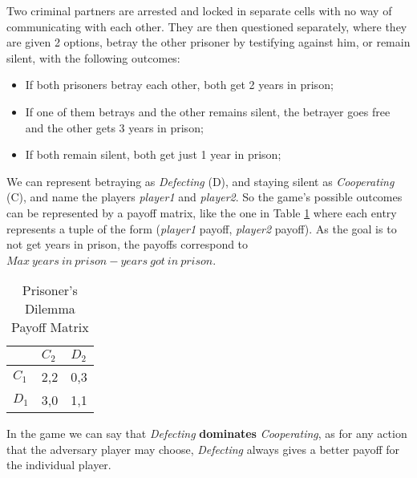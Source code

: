 Two criminal partners are arrested and locked in separate cells with no way of communicating with each other. They are then questioned separately, where they are given 2 options, betray the other prisoner by testifying against him, or remain silent, with the following outcomes:
\begin{itemize}
	\item If both prisoners betray each other, both get 2 years in prison;
	\item If one of them betrays and the other remains silent, the betrayer goes free and the other gets 3 years in prison;
	\item If both remain silent, both get just 1 year in prison;
\end{itemize}

We can represent betraying as \textit{Defecting} (D), and staying silent as \textit{Cooperating} (C), and name the players \textit{player1} and \textit{player2}. So the game's possible outcomes can be represented by a payoff matrix, like the one in Table \ref{PrisonerDilemaPayoffMatrix} where each entry represents a tuple of the form (\textit{player1} payoff, \textit{player2} payoff). As the goal is to not get years in prison, the payoffs correspond to $Max\ years\ in\ prison - years\ got\ in\ prison$.

\begin{table}[]
	\centering
	\begin{tabular}{l|l|l|}
		\cline{2-3}
		& $C_2$   & $D_2$   \\ \hline
		\multicolumn{1}{|l|}{$C_1$} & 2,2 & 0,3 \\ \hline
		\multicolumn{1}{|l|}{$D_1$} & 3,0 & 1,1 \\ \hline
	\end{tabular}
	\caption{Prisoner's Dilemma Payoff Matrix}
	\label{PrisonerDilemaPayoffMatrix}
\end{table}	

In the game we can say that \textit{Defecting} \textbf{dominates} \textit{Cooperating}, as for any action that the adversary player may choose, \textit{Defecting} always gives a better payoff for the individual player\cite{Nash1951}.

